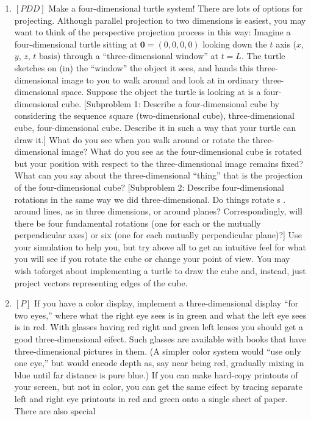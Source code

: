 \documentclass{book}
\begin{document}
\begin{enumerate}
\item $[PDD]$ Make a four-dimensional turtle system! There are lots of
options for projecting. Although parallel projection to two dimensions
is easiest, you may want to think of the perspective projection process
in this way: Imagine a four-dimensional turtle sitting at $\mathbf{0} = (0,0,0,0)$
looking down the $t$ axis ($x$, $y$, $z$, $t$ basis) through a ``three-dimensional
window'' at $t = L$. The turtle sketches on (in) the ``window'' the
object it sees, and hands this three-dimensional image to you to walk
around and look at in ordinary three-dimensional space. Suppose the
object the turtle is looking at is a four-dimensional cube. [Subproblem
1: Describe a four-dimensional cube by considering the sequence square
(two-dimensional cube), three-dimensional cube, four-dimensional cube.
Describe it in such a way that your turtle can draw it.] What do you
see when you walk around or rotate the three-dimensional image? What
do you see as the four-dimensional cube is rotated but your position
with respect to the three-dimensional image remains fixed? What can
you say about the three-dimensional ``thing'' that is the projection of
the four-dimensional cube? [Subproblem 2: Describe four-dimensional
rotations in the same way we did three-dimensional. Do things rotate
s . around lines, as in three dimensions, or around planes? Correspondingly,
will there be four fundamental rotations (one for each or the mutually
perpendicular axes) or six (one for each mutually perpendicular plane)?]
Use your simulation to help you, but try above all to get an intuitive
feel for what you will see if you rotate the cube or change your point of
view. You may wish toforget about implementing a turtle to draw the
cube and, instead, just project vectors representing edges of the cube.
\item $[P]$ If you have a color display, implement a three-dimensional display
``for two eyes,'' where what the right eye sees is in green and what the left
eye sees is in red. With glasses having red right and green left lenses you
should get a good three-dimensional eifect. Such glasses are available
with books that have three-dimensional pictures in them. (A simpler
color system would ``use only one eye,'' but would encode depth as, say
near being red, gradually mixing in blue until far distance is pure blue.)
If you can make hard-copy printouts of your screen, but not in color, you
can get the same eifect by tracing separate left and right eye printouts
in red and green onto a single sheet of paper. There are also special

\end{enumerate}
\end{document}

